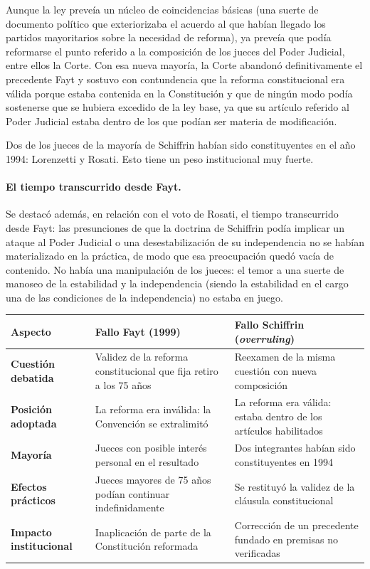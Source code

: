 \documentclass[12pt,oneside]{book}
\begin{document}
Aunque la ley preveía un núcleo de coincidencias básicas (una suerte de documento político que exteriorizaba el acuerdo al que habían llegado los partidos mayoritarios sobre la necesidad de reforma), ya preveía que podía reformarse el punto referido a la composición de los jueces del Poder Judicial, entre ellos la Corte. Con esa nueva mayoría, la Corte abandonó definitivamente el precedente Fayt y sostuvo con contundencia que la reforma constitucional era válida porque estaba contenida en la Constitución y que de ningún modo podía sostenerse que se hubiera excedido de la ley base, ya que su artículo referido al Poder Judicial estaba dentro de los que podían ser materia de modificación.

Dos de los jueces de la mayoría de Schiffrin habían sido constituyentes en el año 1994: Lorenzetti y Rosati.
Esto tiene un peso institucional muy fuerte.

\paragraph{El tiempo transcurrido desde Fayt.} Se destacó además, en relación con el voto de Rosati, el tiempo transcurrido desde Fayt: las presunciones de que la doctrina de Schiffrin podía implicar un ataque al Poder Judicial o una desestabilización de su independencia no se habían materializado en la práctica, de modo que esa preocupación quedó vacía de contenido. No había una manipulación de los jueces: el temor a una suerte de manoseo de la estabilidad y la independencia (siendo la estabilidad en el cargo una de las condiciones de la independencia) no estaba en juego.

\begin{table}[H]
\centering
\small
\begin{tabularx}{\textwidth}{
    >{\raggedright\arraybackslash}p{}
    >{\raggedright\arraybackslash}X
    >{\raggedright\arraybackslash}X
}
\toprule
\textbf{Aspecto} & \textbf{Fallo Fayt (1999)} & \textbf{Fallo Schiffrin (\textit{overruling})} \\
\midrule
\textbf{Cuestión debatida} & Validez de la reforma constitucional que fija retiro a los 75 años & Reexamen de la misma cuestión con nueva composición \\
\textbf{Posición adoptada} & La reforma era inválida: la Convención se extralimitó & La reforma era válida: estaba dentro de los artículos habilitados \\
\textbf{Mayoría} & Jueces con posible interés personal en el resultado & Dos integrantes habían sido constituyentes en 1994 \\
\textbf{Efectos prácticos} & Jueces mayores de 75 años podían continuar indefinidamente & Se restituyó la validez de la cláusula constitucional \\
\textbf{Impacto institucional} & Inaplicación de parte de la Constitución reformada & Corrección de un precedente fundado en premisas no verificadas \\
\bottomrule
\end{tabularx}
\end{table}
\end{document}

